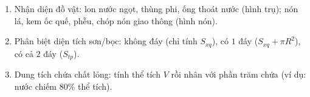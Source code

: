 \begin{enumerate}
\item Nhận diện đồ vật: lon nước ngọt, thùng phi, ống thoát nước (hình trụ); nón lá, kem ốc quế, phễu, chóp nón giao thông (hình nón).
\item Phân biệt diện tích sơn/bọc: không đáy (chỉ tính $S_{xq}$), có $1$ đáy ($S_{xq} + \pi R^2$), có cả $2$ đáy ($S_{tp}$).
\item Dung tích chứa chất lỏng: tính thể tích $V$ rồi nhân với phần trăm chứa (ví dụ: nước chiếm $80\%$ thể tích).
\end{enumerate}
